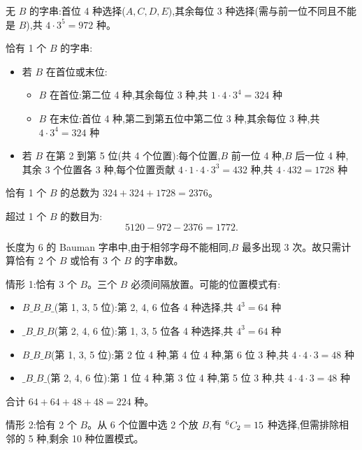 \begin{questions}
\begin{parts}
\begin{solution}
        无 $B$ 的字串:首位 4 种选择($A,C,D,E$),其余每位 3 种选择(需与前一位不同且不能是 $B$),共 $4 \cdot 3^5 = 972$ 种。

        恰有 1 个 $B$ 的字串:
        \begin{itemize}
            \item 若 $B$ 在首位或末位:
            \begin{itemize}
                \item $B$ 在首位:第二位 4 种,其余每位 3 种,共 $1 \cdot 4 \cdot 3^4 = 324$ 种
                \item $B$ 在末位:首位 4 种,第二到第五位中第二位 3 种,其余每位 3 种,共 $4 \cdot 3^4 = 324$ 种
            \end{itemize}
            \item 若 $B$ 在第 2 到第 5 位(共 4 个位置):每个位置,$B$ 前一位 4 种,$B$ 后一位 4 种,其余 3 个位置各 3 种,每个位置贡献 $4 \cdot 1 \cdot 4 \cdot 3^3 = 432$ 种,共 $4 \cdot 432 = 1728$ 种
        \end{itemize}
        恰有 1 个 $B$ 的总数为 $324+ 324 + 1728 = 2376$。

        超过 1 个 $B$ 的数目为:
        \[
        5120 - 972 - 2376 = 1772.
        \]
    \end{solution}
    \begin{solution}
       长度为 6 的 Bauman 字串中,由于相邻字母不能相同,$B$ 最多出现 3 次。故只需计算恰有 2 个 $B$ 或恰有 3 个 $B$ 的字串数。

        情形 1:恰有 3 个 $B$。三个 $B$ 必须间隔放置。可能的位置模式有:
        \begin{itemize}
            \item $B\_B\_B\_$(第 1, 3, 5 位):第 2, 4, 6 位各 4 种选择,共 $4^3 = 64$ 种
            \item $\_B\_B\_B$(第 2, 4, 6 位):第 1, 3, 5 位各 4 种选择,共 $4^3 = 64$ 种
            \item $B\_B\_B$(第 1, 3, 5 位):第 2 位 4 种,第 4 位 4 种,第 6 位 3 种,共 $4 \cdot 4 \cdot 3 = 48$ 种
            \item $\_B\_B\_$(第 2, 4, 6 位):第 1 位 4 种,第 3 位 4 种,第 5 位 3 种,共 $4 \cdot 4 \cdot 3 = 48$ 种
        \end{itemize}
        合计 $64 + 64 + 48 + 48 = 224$ 种。

        情形 2:恰有 2 个 $B$。从 6 个位置中选 2 个放 $B$,有 ${}^{6}C_{2} = 15$ 种选择,但需排除相邻的 5 种,剩余 10 种位置模式。


\end{solution}
\end{parts}
\end{questions}
